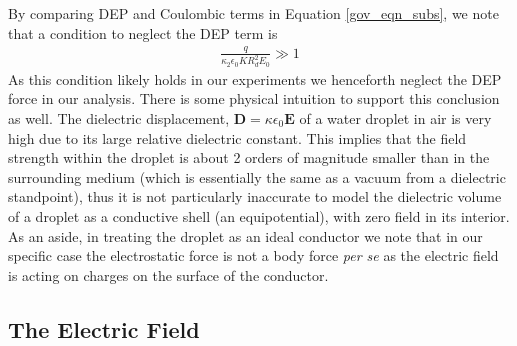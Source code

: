 \documentclass[a4paper, 12pt]{article}
\begin{document}
By comparing DEP and Coulombic terms in Equation \ref{gov_eqn_subs}, we note that a condition to neglect the DEP term is
\begin{eqnarray}
\frac{q}{ \kappa_2 \epsilon_0 K R_d^2 E_0} \gg 1 \nonumber
\end{eqnarray}
As this condition likely holds in our experiments we henceforth neglect the DEP force in our analysis. There is some physical intuition to support this conclusion as well. The dielectric displacement, $\mathbf{D} = \kappa \epsilon_0 \mathbf{E}$ of a water droplet in air is very high due to its large relative dielectric constant. This implies that the field strength within the droplet is about 2 orders of magnitude smaller than in the surrounding medium (which is essentially the same as a vacuum from a dielectric standpoint), thus it is not particularly inaccurate to model the dielectric volume of a droplet as a conductive shell (an equipotential), with zero field in its interior. As an aside, in treating the droplet as an ideal conductor we note that in our specific case the electrostatic force is not a body force \emph{per se} as the electric field is acting on charges on the surface of the conductor.


\subsection{The Electric Field}
\end{document}
